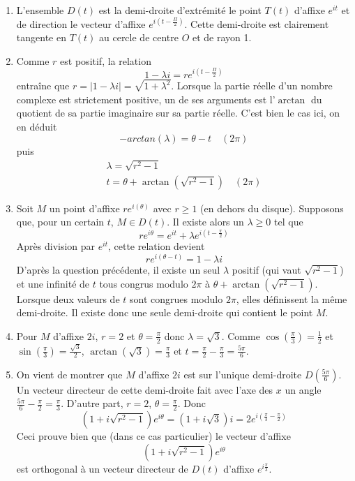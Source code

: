 \begin{enumerate}
\item L'ensemble $D(t)$ est la demi-droite d'extrémité le point $T(t)$ d'affixe $e^{it}$ et de direction le vecteur d'affixe $e^{i(t-\frac{\Pi}{2})}$. Cette demi-droite est clairement tangente en $T(t)$ au cercle de centre $O$ et de rayon 1.
\item Comme $r$ est positif, la relation
\[1-\lambda i = r e^{i(t-\frac{\Pi}{2})}\]
entraîne que $r = \vert 1-\lambda i \vert=\sqrt{1+\lambda^2}$.\newline
Lorsque la partie réelle d'un nombre complexe est strictement positive, un de ses arguments est l'$\arctan$ du quotient de sa partie imaginaire sur sa partie réelle. C'est bien le cas ici, on en déduit
\[-arctan(\lambda)=\theta -t \quad (2\pi)\]
puis
\begin{eqnarray*}
\lambda = \sqrt{r^2-1}\\
 t = \theta + \arctan(\sqrt{r^2-1})\quad (2\pi)
\end{eqnarray*}
\item Soit $M$ un point d'affixe $r e^{i(\theta)}$ avec $r\geq 1$ (en dehors du disque). Supposons que, pour un certain $t$, $M\in D(t)$. Il existe alors un $\lambda \geq 0$ tel que
\[re^{i\theta}=e^{it}+\lambda e^{i(t-\frac{\pi}{2})}\]
Après division par $e^{it}$, cette relation devient
\[re^{i(\theta - t)}=1-\lambda i\]
D'après la question précédente, il existe un seul $\lambda$ positif (qui vaut $\sqrt{r^2 -1}$) et une infinité de $t$ tous congrus modulo $2\pi$ à $\theta + \arctan(\sqrt{r^2-1})$. Lorsque deux valeurs de $t$ sont congrues modulo $2\pi$, elles définissent la même demi-droite. Il existe donc une seule demi-droite qui contient le point $M$.
\item Pour $M$ d'affixe $2i$, $r=2$ et $\theta = \frac{\pi}{2}$ donc $\lambda=\sqrt{3}$. Comme $\cos(\frac{\pi}{3})=\frac{1}{2}$ et $\sin(\frac{\pi}{3})=\frac{\sqrt{3}}{2}$, $\arctan(\sqrt{3})=\frac{\pi}{3}$ et $t= \frac{\pi}{2}-\frac{\pi}{3}=\frac{5\pi}{6}$.
\item On vient de montrer que $M$ d'affixe $2i$ est sur l'unique demi-droite $D(\frac{5\pi}{6})$. Un vecteur directeur de cette demi-droite fait avec l'axe des $x$ un angle $\frac{5\pi}{6}-\frac{\pi}{2}=\frac{\pi}{3}$.\newline
D'autre part, $r=2$, $\theta=\frac{\pi}{2}$. Donc
\[(1+i\sqrt{r^2-1})e^{i\theta}=(1+i\sqrt{3})i=2e^{i(\frac{\pi}{3}-\frac{\pi}{2})}\]
Ceci prouve bien que (dans ce cas particulier) le vecteur d'affixe
\[(1+i\sqrt{r^2-1})e^{i\theta}\]
est orthogonal à un vecteur directeur de $D(t)$ d'affixe $e^{i\frac{\pi}{3}}$.\newline

\end{enumerate}
